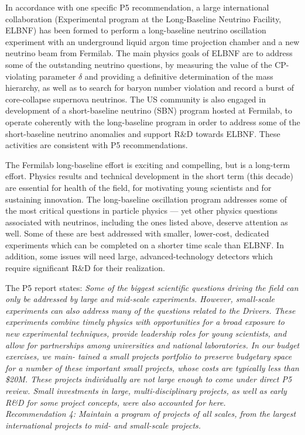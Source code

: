 In accordance with one specific P5 recommendation, a large international
collaboration (Experimental program at the Long-Baseline Neutrino
Facility, ELBNF) has been formed to perform a long-baseline neutrino
oscillation experiment with an underground liquid argon time
projection chamber and a new neutrino beam from
Fermilab.  The main physics goals of ELBNF are to address some of the
outstanding neutrino questions, by measuring the value of
the CP-violating parameter $\delta$ and providing a definitive
determination of the mass hierarchy, as well as to search for baryon
number violation and record a burst of core-collapse supernova
neutrinos.  The US community is also engaged in development of a
short-baseline neutrino (SBN) program hosted at Fermilab, to operate
coherently with the long-baseline program in order to address some of the 
short-baseline neutrino anomalies and support R\&D towards ELBNF. 
These activities are consistent with P5 recommendations.

The Fermilab long-baseline effort is exciting and compelling, but
is a long-term effort.  Physics results and technical development in
the short term (this decade) are essential for health of the field,
for motivating young scientists and for sustaining innovation.  The
long-baseline oscillation program addresses some of the most critical
questions in particle physics --- yet other physics questions
associated with neutrinos, including the ones listed above, deserve
attention as well.  Some of these are best addressed with smaller,
lower-cost, dedicated experiments which can be completed
on a shorter time scale than ELBNF.  In addition, some issues will
need large, advanced-technology detectors which require
significant R\&D for their realization.

The P5 report states:
\textit{Some of the biggest scientific questions driving the field can only be
addressed by large and mid-scale experiments. However, small-scale
experiments can also address many of the questions related to the
Drivers. These experiments combine timely physics with opportunities
for a broad exposure to new experimental techniques, provide
leadership roles for young scientists, and allow for partnerships
among universities and national laboratories. In our budget exercises,
we main- tained a small projects portfolio to preserve budgetary space
for a number of these important small projects, whose costs are
typically less than \$20M. These projects individually are not large
enough to come under direct P5 review. Small investments in large,
multi-disciplinary projects, as well as early R\&D for some project
concepts, were also accounted for here.}\\
\textit{{Recommendation 4: Maintain a program of projects of all
  scales, from the largest international projects to mid- and
  small-scale projects.}}


